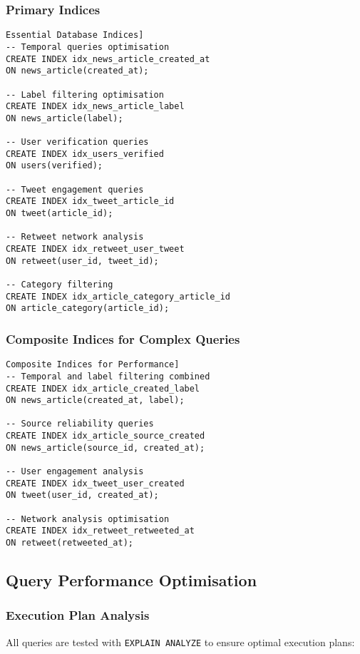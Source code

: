 \documentclass[11pt,a4paper]{article}
\begin{document}
\subsubsection{Primary Indices}
\begin{verbatim}Essential Database Indices]
-- Temporal queries optimisation
CREATE INDEX idx_news_article_created_at 
ON news_article(created_at);

-- Label filtering optimisation  
CREATE INDEX idx_news_article_label 
ON news_article(label);

-- User verification queries
CREATE INDEX idx_users_verified 
ON users(verified);

-- Tweet engagement queries
CREATE INDEX idx_tweet_article_id 
ON tweet(article_id);

-- Retweet network analysis
CREATE INDEX idx_retweet_user_tweet 
ON retweet(user_id, tweet_id);

-- Category filtering
CREATE INDEX idx_article_category_article_id 
ON article_category(article_id);
\end{verbatim}

\subsubsection{Composite Indices for Complex Queries}
\begin{verbatim}Composite Indices for Performance]
-- Temporal and label filtering combined
CREATE INDEX idx_article_created_label 
ON news_article(created_at, label);

-- Source reliability queries
CREATE INDEX idx_article_source_created 
ON news_article(source_id, created_at);

-- User engagement analysis
CREATE INDEX idx_tweet_user_created 
ON tweet(user_id, created_at);

-- Network analysis optimisation
CREATE INDEX idx_retweet_retweeted_at 
ON retweet(retweeted_at);
\end{verbatim}

\subsection{Query Performance Optimisation}

\subsubsection{Execution Plan Analysis}
All queries are tested with \texttt{EXPLAIN ANALYZE} to ensure optimal execution plans:
\end{document}
